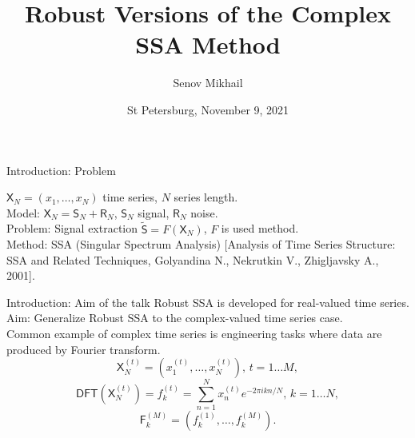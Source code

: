 \documentclass[ucs, notheorems, handout]{beamer}
\title[Robust CSSA]
{Robust Versions of the Complex SSA Method}
\subtitle
{}
\author[Senov M.] 
{Senov Mikhail}
\institute{
\small
    St Petersburg University\\
    Department of Statistical Modelling\\
    \vspace{1cm}
Science and Progress}
\date[Conference]{St Petersburg, November 9, 2021}
\newcommand{\tX}[1]{\mathsf{#1}}
\begin{document}
\begin{frame}
  \titlepage
  \note{}
\end{frame}

\begin{frame}{Introduction: Problem}

$\tX{X}_N = (x_1, \ldots, x_{N})$ time series, $N$ series length.\\
\vspace{1em}
\alert{Model:} $\tX{X}_N = \tX{S}_N + \tX{R}_N$, $\tX{S}_N$ signal, $\tX{R}_N$ noise.\\
\vspace{1em}
\alert{Problem:} Signal extraction $\tilde{\tX{S}} = F(\tX{X}_N)$, $F$ is used method.\\
\vspace{1em}
\alert{Method:} SSA (Singular Spectrum Analysis) [Analysis of Time Series
Structure: SSA and Related Techniques, Golyandina N., Nekrutkin V.,
Zhigljavsky A., 2001].

    \note{}
\end{frame}


\begin{frame}{Introduction: Aim of the talk}
    Robust SSA is developed for real-valued time series.\\
    \vspace{1em}
    \alert{Aim:} Generalize Robust SSA to the complex-valued time series case.\\
    \vspace{1em}
   Common example of complex time series is engineering tasks where data are produced by Fourier transform.
   $$\tX{X}_N^{(t)} = (x_1^{(t)}, \ldots, x_N^{(t)}), \, t = 1 \ldots M,$$
   $$\tX{DFT}(\tX{X}_N^{(t)}) = f^{(t)}_k = \sum_{n=1}^{N}x^{(t)}_n e^{-2 \pi i k  n / N}, \, k = 1 \ldots N,$$
   $$\tX{F}^{(M)}_{k} = (f^{(1)}_k, \ldots, f^{(M)}_k).$$
\end{frame}
\end{document}
